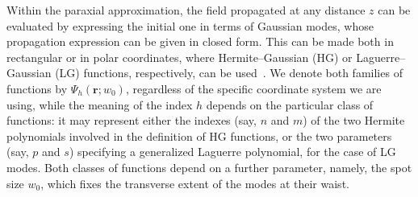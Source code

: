 \documentclass{article}
\newcommand{\bs}{\boldsymbol}
\begin{document}
Within the paraxial approximation, the field propagated at any distance $z$ can be evaluated by expressing the initial one in terms of Gaussian modes, whose propagation expression can be given in closed form. This can be made both in rectangular or in polar coordinates, where Hermite--Gaussian (HG) or Laguerre--Gaussian (LG) functions, respectively, can be used~\cite{ABRAMOCHKIN:OC91}. We denote both families of functions by $\Psi_{h}({\bs r}; w_0)$, regardless of the specific coordinate system we are using, while the meaning of the index $h$  depends on the particular class of functions: it may represent either the indexes (say, $n$ and $m$) of the two Hermite polynomials involved in the definition of HG functions, or the two parameters (say, $p$ and $s$) specifying a generalized Laguerre polynomial, for the case of LG modes. Both classes of functions depend on a further parameter, namely, the spot size $w_0$, which fixes the transverse extent of the modes at their waist. 
\end{document}
